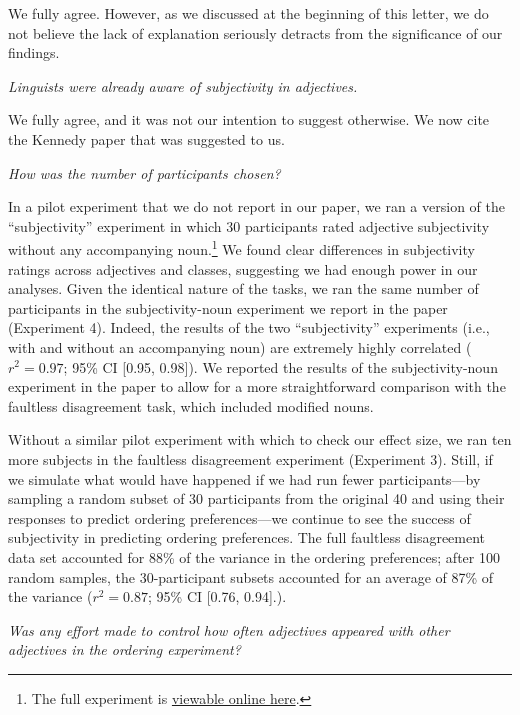 \documentclass[12pt]{article}
\begin{document}
We fully agree. However, as we discussed at the beginning of this letter, we do not believe the lack of explanation seriously detracts from the significance of our findings.


\item \emph{Linguists were already aware of subjectivity in adjectives.}

We fully agree, and it was not our intention to suggest otherwise. We now cite the Kennedy paper that was suggested to us.


\item \emph{How was the number of participants chosen?}

In a pilot experiment that we do not report in our paper, we ran a version of the ``subjectivity'' experiment in which 30 participants rated adjective subjectivity without any accompanying noun.\footnote{The full experiment is \href{http://web.stanford.edu/~scontras/adjective_ordering/experiments/6-subjectivity/subjectivity.html}{viewable online here}.} We found clear differences in subjectivity ratings across adjectives and classes, suggesting we had enough power in our analyses. 
Given the identical nature of the tasks, we ran the same number of participants in the subjectivity-noun experiment we report in the paper (Experiment 4). Indeed, the results of the two ``subjectivity'' experiments (i.e., with and without an accompanying noun) are extremely highly correlated ($r^2=0.97$; 95\% CI [0.95,  0.98]). We reported the results of the subjectivity-noun experiment in the paper to allow for a more straightforward comparison with the faultless disagreement task, which included modified nouns.

Without a similar pilot experiment with which to check our effect size, we ran ten more subjects in the faultless disagreement experiment (Experiment 3). Still, if we simulate what would have happened if we had run fewer participants---by sampling a random subset of 30 participants from the original 40 and using their responses to predict ordering preferences---we continue to see the success of subjectivity in predicting ordering preferences. The full faultless disagreement data set accounted for 88\% of the variance in the ordering preferences; after 100 random samples, the 30-participant subsets accounted for an average of 87\% of the variance ($r^2=0.87$; 95\% CI [0.76, 0.94].).


\item \emph{Was any effort made to control how often adjectives appeared with other adjectives in the ordering experiment?}
\end{document}

